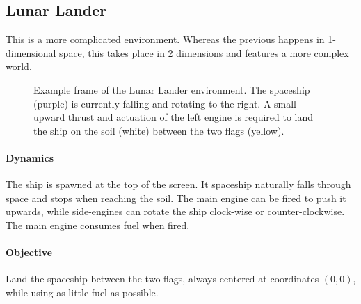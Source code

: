 \documentclass{article}
\begin{document}
\newpage
\subsection{Lunar Lander}
\label{subsec:lander}

This is a more complicated environment. Whereas the previous happens in 1-dimensional space, this takes place in 2 dimensions and features a more complex world.

\begin{figure}[!h]
\centering
  \caption{Example frame of the Lunar Lander environment. The spaceship (purple) is currently falling and rotating to the right. A small upward thrust and actuation of the left engine is required to land the ship on the soil (white) between the two flags (yellow).}
  \label{fig:lander}
\end{figure}


\paragraph{Dynamics} The ship is spawned at the top of the screen. It spaceship naturally falls through space and stops when reaching the soil. The main engine can be fired to push it upwards, while side-engines can rotate the ship clock-wise or counter-clockwise. The main engine consumes fuel when fired.

\paragraph{Objective} Land the spaceship between the two flags, always centered at coordinates $(0, 0)$, while using as little fuel as possible.
\end{document}
